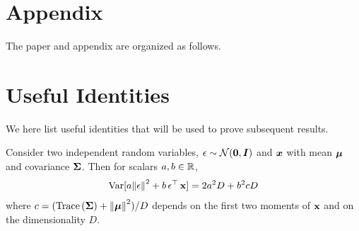 
\appendix
\clearpage

\section*{Appendix}

The paper and appendix are organized as follows.

\renewcommand{\contentsname}{}
\vspace{-1cm}
\tableofcontents
\newpage


\section{Useful Identities}
\label{app:sec:identities}

We here list useful identities that will be used to prove subsequent results. 


\begin{lemma}
\label{lemma:variance_random_var}
Consider two independent random variables, $\operatorname{\mathbf{\epsilon}} \sim \mathcal{N}(\operatorname{\mathbf{0}}, {\bm{I}})$ and ${\bm{x}}$ with mean $\operatorname{\bm{\mu}}$ and covariance ${\bm{\Sigma}}$. Then for scalars $a, b \in \mathbb{R}$,
\begin{align}
    \mathrm{Var}[
    a \norm{\operatorname{\mathbf{\epsilon}}}^{2} + b\operatorname{\mathbf{\epsilon}}^{\top}\operatorname{\mathbf{x}}
    ]
    =
    2 a^{2}D + b^{2}c D
\end{align}
where $c = (\text{Trace}\left({\bm{\Sigma}}\right)+ \norm{\operatorname{\bm{\mu}}}^{2})/D$ depends on the first two moments of $\operatorname{\mathbf{x}}$ and on the dimensionality $D$.
\end{lemma}


